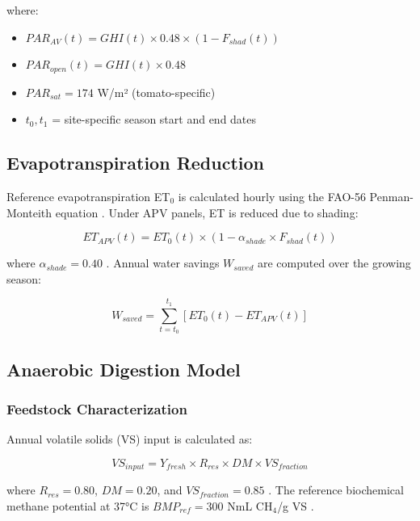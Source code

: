 \documentclass[12pt, a4paper]{article}
\begin{document}
where:
\begin{itemize}[leftmargin=*]
    \item $PAR_{AV}(t) = GHI(t) \times 0.48 \times (1 - F_{shad}(t))$
    \item $PAR_{open}(t) = GHI(t) \times 0.48$
    \item $PAR_{sat} = 174$ W/m² (tomato-specific)
    \item $t_0, t_1$ = site-specific season start and end dates
\end{itemize}

\subsection{Evapotranspiration Reduction}

\hspace{1cm}Reference evapotranspiration ET$_0$ is calculated hourly using the FAO-56 Penman-Monteith equation \cite{allen1998}. Under APV panels, ET is reduced due to shading:

\begin{equation}
ET_{APV}(t) = ET_0(t) \times (1 - \alpha_{shade} \times F_{shad}(t))
\label{eq:et}
\end{equation}

where $\alpha_{shade} = 0.40$ \cite{tawassulli2025, elamri2018}. Annual water savings $W_{saved}$ are computed over the growing season:

\begin{equation}
W_{saved} = \sum_{t=t_0}^{t_1} \left[ET_0(t) - ET_{APV}(t)\right]
\label{eq:watersaved}
\end{equation}

\subsection{Anaerobic Digestion Model}

\subsubsection{Feedstock Characterization}

\hspace{1cm}Annual volatile solids (VS) input is calculated as:

\begin{equation}
VS_{input} = Y_{fresh} \times R_{res} \times DM \times VS_{fraction}
\label{eq:vsinput}
\end{equation}

where $R_{res} = 0.80$, $DM = 0.20$, and $VS_{fraction} = 0.85$ \cite{mohammedi2023, lallement2023}. The reference biochemical methane potential at 37°C is $BMP_{ref} = 300$ NmL CH$_4$/g VS \cite{feng2013, lallement2023}.
\end{document}
